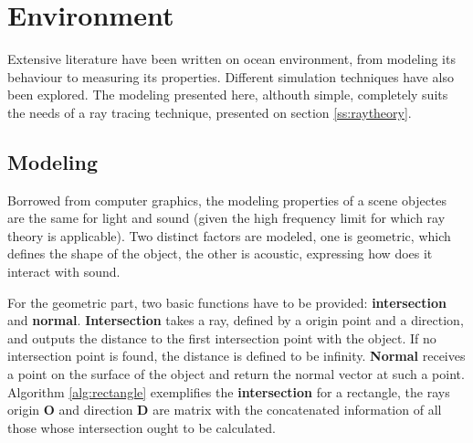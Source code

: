 \section{Environment}

Extensive literature have been written on ocean environment, from modeling its
behaviour to measuring its properties. Different simulation techniques have also
been explored\cite{Etter2013}. The modeling presented here, althouth simple,
completely suits the needs of a ray tracing technique, presented on section
\ref{ss:raytheory}.

\subsection{Modeling}
\label{ss:modeling}
Borrowed from computer graphics, the modeling properties of a scene objectes
are the same for light and sound (given the high frequency limit for which ray
theory is applicable). Two distinct factors are modeled, one is geometric,
which defines the shape of the object, the other is acoustic, expressing how
does it interact with sound.

For the geometric part, two basic functions have to be provided: \textbf{intersection}
and \textbf{normal}. \textbf{Intersection} takes a ray, defined by a origin point and a
direction, and outputs the distance to the first intersection point with the
object. If no intersection point is found, the distance is defined to be
infinity. \textbf{Normal} receives a point on the surface of the object and
return the normal vector at such a point. Algorithm \ref{alg:rectangle}
exemplifies the \textbf{intersection} for a rectangle, the rays origin
$\mathbf{O}$ and direction $\mathbf{D}$ are matrix with the concatenated
information of all those whose intersection ought to be calculated.

